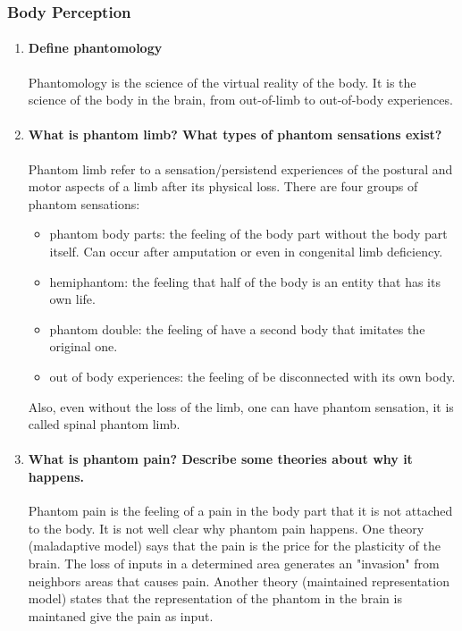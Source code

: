 \documentclass[12pt,article,oneside,a4paper]{memoir}
\begin{document}
\subsubsection{Body Perception}
\begin{enumerate}
\item \paragraph{Define phantomology}
Phantomology is the science of the virtual reality of the body. It is the
science of the body in the brain, from out-of-limb to out-of-body experiences.

\item \paragraph{What is phantom limb? What types of phantom sensations exist?}
Phantom limb refer to a sensation/persistend experiences of the postural and
motor aspects of a limb after its physical loss.
There are four groups of phantom sensations:
\begin{itemize}
\item phantom body parts: the feeling of the body part without the body part
itself. Can occur after amputation or even in congenital limb deficiency.
\item hemiphantom: the feeling that half of the body is an entity that has its
own life.
\item phantom double: the feeling of have a second body that imitates the
original one.
\item out of body experiences: the feeling of be disconnected with its own
body.
\end{itemize}

Also, even without the loss of the limb, one can have phantom sensation, it is
called spinal phantom limb.

\item \paragraph{What is phantom pain? Describe some theories about why it
happens.}
Phantom pain is the feeling of a pain in the body part that it is not attached
to the body. It is not well clear why phantom pain happens. One theory
(maladaptive model) says that the pain is the price for the plasticity of the
brain. The loss of inputs in a determined area generates an "invasion" from
neighbors areas that causes pain. Another theory (maintained representation
model) states that the representation of the phantom in the brain is maintaned
give the pain as input.


\end{enumerate}
\end{document}
